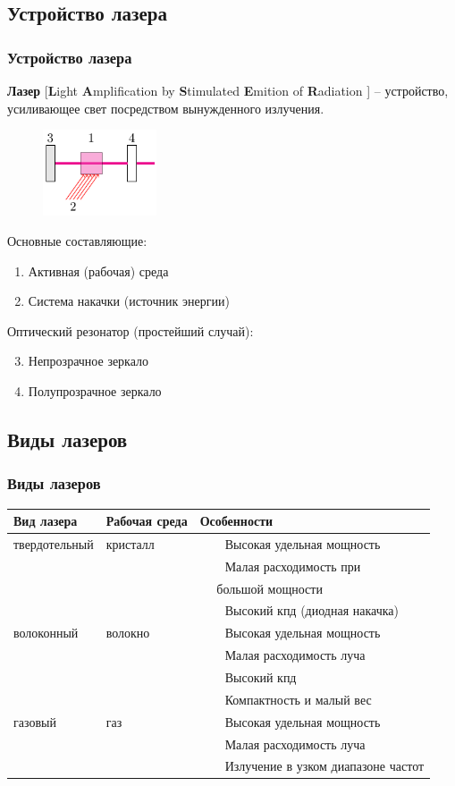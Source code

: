 \documentclass[10pt,pdf,hyperref={unicode}, dvipsnames]{beamer}
\newcommand\frametitless[1]{\subsection{#1}\frametitle{#1}}
\newcommand{\tabitem}{~~\llap{\textbullet}~~}
\begin{document}
\begin{frame}[t]
	\frametitless{Устройство лазера}
	\textbf{Лазер} [\textbf{L}ight \textbf{A}mplification by \textbf{S}timulated \textbf{E}mition of \textbf{R}adiation ] -- устройство, усиливающее свет посредством вынужденного излучения.

	\begin{figure}[h]
		\centering
		\includegraphics[width=0.3\textwidth]{images/las1}
	\end{figure}	

	Основные составляющие:
	\begin{enumerate}
		\item Активная (рабочая) среда
		\item Система накачки (источник энергии)
	\end{enumerate}

	Оптический резонатор (простейший случай):
	\begin{enumerate}
	\setcounter{enumi}{2}		
		\item Непрозрачное зеркало
		\item Полупрозрачное зеркало
	\end{enumerate}

\end{frame}
\begin{frame}[t]
	\frametitless{Виды лазеров}
	\vfill
  \begin{tabular}{*{3}{l}}
    \toprule
    Вид лазера & Рабочая среда & Особенности \\
    \midrule
    твердотельный & кристалл & \tabitem Высокая удельная мощность \\
    	&&\tabitem Малая расходимость при\\
    	&&$\quad$ большой мощности\\
		&&\tabitem Высокий кпд (диодная накачка)\\
    \midrule

    волоконный & волокно & \tabitem Высокая удельная мощность \\
    	&&\tabitem Малая расходимость луча\\
		&&\tabitem Высокий кпд \\		
		&&\tabitem Компактность и малый вес \\		
    \midrule

    газовый & газ & \tabitem Высокая удельная мощность \\
    	&&\tabitem Малая расходимость луча\\
		&&\tabitem Излучение в узком диапазоне частот \\		
    \bottomrule
  \end{tabular}
\vfill
\end{frame}
\end{document}
